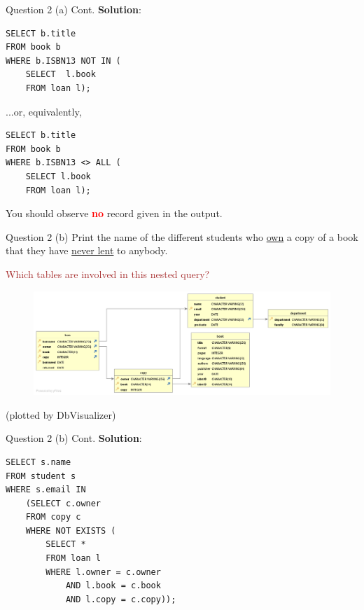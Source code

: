 \begin{frame}[fragile]{Question 2 (a) Cont.}
\textbf{Solution}:

\begin{lstlisting}
SELECT b.title 
FROM book b
WHERE b.ISBN13 NOT IN (
	SELECT  l.book 
	FROM loan l);
\end{lstlisting}\vspace{5pt}

...or, equivalently,

\begin{lstlisting}
SELECT b.title 
FROM book b
WHERE b.ISBN13 <> ALL (
	SELECT l.book 
	FROM loan l);
\end{lstlisting}\vspace{5pt}

You should observe \textcolor{red}{\textbf{no}} record given in the output. 
\end{frame}

\begin{frame}[fragile]{Question 2 (b)}
Print the name of the different students who \underline{own} a copy of a book that they have \underline{never lent} to anybody.\\ \vspace{5pt}

\textcolor{brown}{Which tables are involved in this nested query?}
\begin{figure}
	\includegraphics[width=1\textwidth]{t1/images/t1-end.png}
\end{figure}\vspace{-10pt}
{\tiny(plotted by DbVisualizer)}
\end{frame}

\begin{frame}[fragile]{Question 2 (b) Cont.}
\textbf{Solution}:
	
\begin{lstlisting}
SELECT s.name 
FROM student s
WHERE s.email IN 
	(SELECT c.owner
	FROM copy c
	WHERE NOT EXISTS (
		SELECT * 
		FROM loan l
		WHERE l.owner = c.owner
			AND l.book = c.book
			AND l.copy = c.copy));
\end{lstlisting}\vspace{5pt}
\end{frame}


